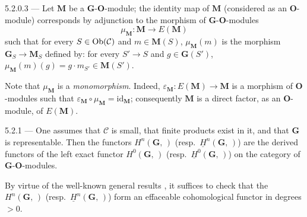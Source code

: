 \begin{definition}{5.2.0.3}\label{I.5.2.0.3}
--- Let \(\mathbf{M}\) be a \(\mathbf{G}\)-\(\mathbf{O}\)-module; the identity map
of \(\mathbf{M}\) (considered as an \(\mathbf{O}\)-module) corresponds by
adjunction to the morphism of \(\mathbf{G}\)-\(\mathbf{O}\)-modules
\[
\mu_{\mathbf{M}} \colon \mathbf{M} \longrightarrow E(\mathbf{M})
\]
such that for every \(S \in \operatorname{Ob}(\mathcal{C})\) and \(m \in \mathbf{M}(S)\),
\(\mu_{\mathbf{M}}(m)\) is the morphism
\(\mathbf{G}_{S} \to \mathbf{M}_{S}\) defined by: for every \(S' \to S\) and
\(g \in \mathbf{G}(S')\),
\(\mu_{\mathbf{M}}(m)(g) = g \cdot m_{S'} \in \mathbf{M}(S')\).

Note that \(\mu_{\mathbf{M}}\) is a \emph{monomorphism}. Indeed,
\(\varepsilon_{\mathbf{M}} \colon E(\mathbf{M}) \to \mathbf{M}\) is a morphism
of \(\mathbf{O}\)-modules such that
\(\varepsilon_{\mathbf{M}} \circ \mu_{\mathbf{M}} = \mathrm{id}_{\mathbf{M}}\);
consequently \(\mathbf{M}\) is a direct factor, as an \(\mathbf{O}\)-module,
of \(E(\mathbf{M})\).
\end{definition}

\begin{proposition}{5.2.1}\label{I.5.2.1}
--- One assumes that \(\mathcal{C}\) is small, that finite products exist in it,
and that \(\mathbf{G}\) is representable. Then the functors
\(H^{n}(\mathbf{G},\,)\) (resp.\ \(\underline{H}^{n}(\mathbf{G},\,)\)) are the
derived functors of the left exact functor \(H^{0}(\mathbf{G},\,)\)
(resp.\ \(\underline{H}^{0}(\mathbf{G},\,)\)) on the category of
\(\mathbf{G}\)-\(\mathbf{O}\)-modules.
\end{proposition}

By virtue of the well-known general results%
{\renewcommand{\thefootnote}{(49)}},
it suffices to check that the \(H^{n}(\mathbf{G},\,)\)
(resp.\ \(\underline{H}^{n}(\mathbf{G},\,)\)) form an effaceable cohomological
functor in degrees \(> 0\).


